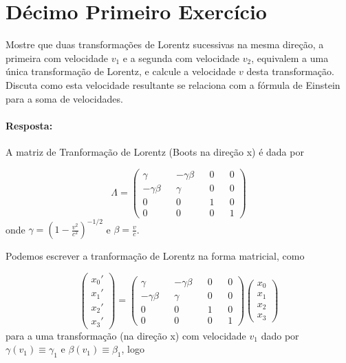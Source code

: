 \documentclass[10pt,a4paper]{article}
\begin{document}
\section{Décimo Primeiro Exercício}
Mostre que duas transformações de Lorentz sucessivas na mesma direção, a primeira com velocidade $ v_1 $ e a segunda com velocidade $ v_2 $, equivalem
a uma única transformação de Lorentz, e calcule a velocidade $ v $ desta transformação. Discuta como esta velocidade resultante se relaciona com a fórmula de Einstein para a soma de velocidades. 

\paragraph{Resposta: }
A matriz de Tranformação de Lorentz (Boots na direção x) é dada por

$$ \Lambda = \left(\begin{matrix}
	\gamma&&-\gamma\beta&&0&&0\\
	-\gamma\beta&&\gamma&&0&&0\\
	0&&0&&1&&0\\
	0&&0&&0&&1
\end{matrix}\right)$$
 onde $\gamma = \left(1 -\frac{v^2}{c^2}\right)^{-1/2}$ e $\beta = \frac{v}{c}$.
 
 Podemos escrever a tranformação de Lorentz na forma matricial, como
 
 \begin{equation}\nonumber
 	\left(\begin{matrix}
 		x_0'\\
 		x_1'\\
 		x_2'\\
 		x_3'
 	\end{matrix}\right) = \left(\begin{matrix}
 	\gamma&&-\gamma\beta&&0&&0\\
 	-\gamma\beta&&\gamma&&0&&0\\
 	0&&0&&1&&0\\
 	0&&0&&0&&1
 \end{matrix}\right)\left(\begin{matrix}
 x_0\\
 x_1\\
 x_2\\
 x_3
\end{matrix}\right)
 \end{equation}
para a uma transformação (na direção x) com velocidade $ v_1 $ dado por $ \gamma(v_1) \equiv \gamma_1 $ e $ \beta(v_1) \equiv \beta_1 $, logo
\end{document}
